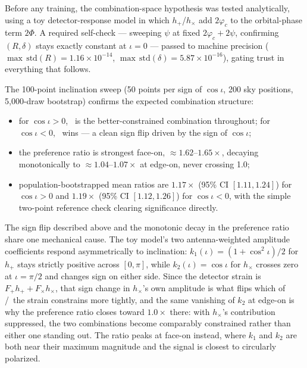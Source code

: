 Before any training, the combination-space hypothesis was tested analytically, using a toy detector-response model in which $h_+$/$h_\times$ add $2\varphi_c$ to the orbital-phase term $2\Phi$.
A required self-check --- sweeping $\psi$ at fixed $2\varphi_c+2\psi$, confirming $(R,\delta)$ stays exactly constant at $\iota=0$ --- passed to machine precision ($\max\,\text{std}(R)=1.16\times10^{-14}$, $\max\,\text{std}(\delta)=5.87\times10^{-16}$), gating trust in everything that follows.

The 100-point inclination sweep (50 points per sign of $\cos\iota$, 200 sky positions, 5{,}000-draw bootstrap) confirms the expected combination structure:
\begin{itemize}
    \item for $\cos\iota>0$, \comboBFull\ is the better-constrained combination throughout; for $\cos\iota<0$, \comboAFull\ wins --- a clean sign flip driven by the sign of $\cos\iota$;
    \item the preference ratio is strongest face-on, $\approx1.62$--$1.65\times$, decaying monotonically to $\approx1.04$--$1.07\times$ at edge-on, never crossing 1.0;
    \item population-bootstrapped mean ratios are $1.17\times$ (95\% CI $[1.11,1.24]$) for $\cos\iota>0$ and $1.19\times$ (95\% CI $[1.12,1.26]$) for $\cos\iota<0$, with the simple two-point reference check clearing significance directly.
\end{itemize}

The sign flip described above and the monotonic decay in the preference ratio share one mechanical cause.
The toy model's two antenna-weighted amplitude coefficients respond asymmetrically to inclination: $k_1(\iota)=(1+\cos^2\iota)/2$ for $h_+$ stays strictly positive across $[0,\pi]$, while $k_2(\iota)=\cos\iota$ for $h_\times$ crosses zero at $\iota=\pi/2$ and changes sign on either side.
Since the detector strain is $F_+h_++F_\times h_\times$, that sign change in $h_\times$'s own amplitude is what flips which of \comboA/\comboB\ the strain constrains more tightly, and the same vanishing of $k_2$ at edge-on is why the preference ratio closes toward $1.0\times$ there: with $h_\times$'s contribution suppressed, the two combinations become comparably constrained rather than either one standing out.
The ratio peaks at face-on instead, where $k_1$ and $k_2$ are both near their maximum magnitude and the signal is closest to circularly polarized.


